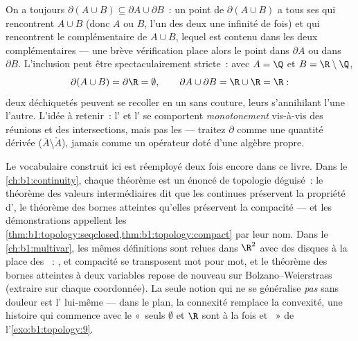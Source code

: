 \begin{example}\label{ex:b1:topology:boundaryunion}
On a toujours $\partial(A \cup B) \subseteq \partial A \cup \partial
B$~: un point de $\partial(A \cup B)$ a tous ses  qui
rencontrent $A \cup B$ (donc $A$ ou $B$, l'un des deux une
infinité de fois) et qui rencontrent le complémentaire de $A \cup
B$, lequel est contenu dans les deux complémentaires --- une brève
vérification place alors le point dans $\partial A$ ou dans
$\partial B$. L'inclusion peut être spectaculairement stricte~:
avec $A = \Q$ et $B = \R\setminus\Q$,
\[
\partial(A \cup B) = \partial \R = \emptyset ,
\qquad
\partial A \cup \partial B = \R \cup \R = \R :
\]
deux  déchiquetés peuvent se recoller en un  sans
couture, leurs  s'annihilant l'une l'autre. L'idée à
retenir~: l' et l' se comportent
\emph{monotonement} vis-à-vis des réunions et des intersections,
mais pas les  --- traitez $\partial$ comme une quantité
dérivée ($\overline A \setminus \mathring A$), jamais comme un
opérateur doté d'une algèbre propre.
\end{example}

\begin{remark}
Le vocabulaire construit ici est réemployé deux fois encore dans
ce livre. Dans le \cref{ch:b1:continuity}, chaque théorème est un
énoncé de topologie déguisé~: le théorème des valeurs
intermédiaires dit que les  continues préservent la
propriété d', le théorème des bornes atteintes qu'elles
préservent la compacité --- et les démonstrations appellent
les \cref{thm:b1:topology:seqclosed,thm:b1:topology:compact} par leur
nom. Dans le \cref{ch:b1:multivar}, les mêmes définitions sont
relues dans $\R^2$ avec des disques à la place des ~:
,  et compacité se transposent mot pour mot, et
le théorème des bornes atteintes à deux variables repose de
nouveau sur Bolzano--Weierstrass (extraire sur chaque
coordonnée). La seule notion qui ne se généralise \emph{pas} sans
douleur est l' lui-même --- dans le plan, la connexité
remplace la convexité, une histoire qui commence avec le
«~seuls $\emptyset$ et $\R$ sont à la fois  et ~» de
l'\cref{exo:b1:topology:9}.
\end{remark}

